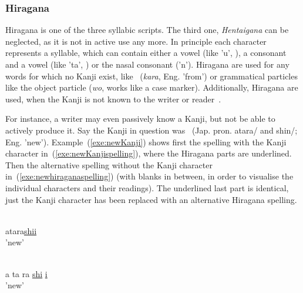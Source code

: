 \subsubsection{Hiragana }
\label{sec:hiragana}

Hiragana is one of the three syllabic scripts. The third one, 
\emph{Hentaigana} can be neglected, as it is not in active use any more. %
In principle each character represents a syllable, which can contain either a 
vowel (like 'u', ), a consonant and a vowel (like 'ta', ) or the 
nasal consonant  ('n').
Hiragana are used for any words for which no Kanji exist, like 
~(\emph{kara}, Eng. 'from') or grammatical particles like the object 
particle  (\emph{wo}, works like a case marker).
Additionally, Hiragana are used, when the Kanji is not known to the writer or 
reader~. 

For instance, a writer may even passively know a Kanji, but not be able
to actively produce it. Say the Kanji in question was ~(Jap. pron. 
atara/ and shin/; Eng. 'new'). Example~(\ref{exe:newKanji})
shows first the spelling with the Kanji character 
in~(\ref{exe:newKanjispelling}), where the Hiragana parts are underlined.
Then the alternative spelling without the Kanji character 
in~(\ref{exe:newhiraganaspelling}) (with blanks in between, in order to visualise
the individual characters and their readings). The underlined last part is 
identical, just the Kanji character has been replaced with an alternative 
Hiragana spelling.
\begin{exe}
\ex \label{exe:newKanji}
\begin{xlist}
\ex \label{exe:newKanjispelling}
\gll {}\underline{} \\
atara\underline{shii} \\
\trans 'new'

\ex \label{exe:newhiraganaspelling}
\gll {}   \underline{} \underline{} \\
a ta ra \underline{shi} \underline{i} \\
\trans 'new'
\end{xlist}
\end{exe}

